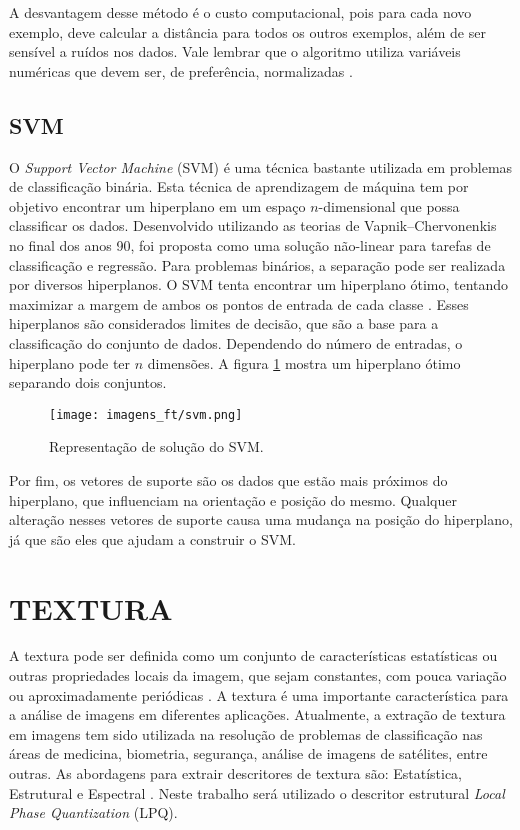 A desvantagem desse método é o custo computacional, pois para cada novo exemplo, deve calcular a distância para todos os outros exemplos, além de ser sensível a ruídos nos dados. Vale lembrar que o algoritmo utiliza variáveis numéricas que devem ser, de preferência, normalizadas \cite{knn3}.

\subsection{SVM}

O \textit{Support Vector Machine} (SVM) é uma técnica bastante utilizada em problemas de classificação binária. Esta técnica de aprendizagem de máquina tem por objetivo encontrar um hiperplano em um espaço $n$-dimensional que possa classificar os dados. Desenvolvido utilizando as teorias de Vapnik–Chervonenkis \cite{vapnik1995nature} no final dos anos 90, foi proposta como uma solução não-linear para tarefas de classificação e regressão. Para problemas binários, a separação pode ser realizada por diversos hiperplanos. O SVM tenta encontrar um hiperplano ótimo, tentando maximizar a margem de ambos os pontos de entrada de cada classe \cite{svm1, svm2}. Esses hiperplanos são considerados limites de decisão, que são a base para a classificação do conjunto de dados. Dependendo do número de entradas, o hiperplano pode ter $n$ dimensões. A figura \ref{fig:svm} mostra um hiperplano ótimo separando dois conjuntos.

\begin{figure}[H]
	\centering
	\texttt{[image: imagens\_ft/svm.png]}
	\caption{Representação de solução do SVM. \cite{vapnik1995nature}}
	\label{fig:svm}
\end{figure}

Por fim, os vetores de suporte são os dados que estão mais próximos do hiperplano, que influenciam na orientação e posição do mesmo. Qualquer alteração nesses vetores de suporte causa uma mudança na posição do hiperplano, já que são eles que ajudam a construir o SVM.

\section{TEXTURA}

A textura pode ser definida como um conjunto de características estatísticas ou outras propriedades locais da imagem, que sejam constantes, com pouca variação ou aproximadamente periódicas \cite{gonzalezprocessamento}. A textura é uma importante característica para a análise de imagens em diferentes aplicações. Atualmente, a extração de textura em imagens tem sido utilizada na resolução de problemas de classificação nas áreas de medicina, biometria, segurança, análise de imagens de satélites, entre outras. As abordagens para extrair descritores de textura são: Estatística, Estrutural e Espectral \cite{gonzalezprocessamento}. Neste trabalho será utilizado o descritor estrutural \textit{Local Phase Quantization} (LPQ).


